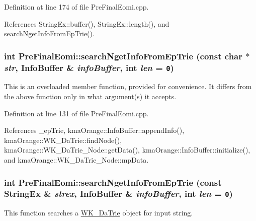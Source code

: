 Definition at line 174 of file PreFinalEomi.cpp.

References StringEx::buffer(), StringEx::length(), and searchNgetInfoFromEpTrie().\hypertarget{classkmaOrange_1_1PreFinalEomi_1440ff5046195cb344bb104b2a52f48a}{
\subsubsection[{searchNgetInfoFromEpTrie}]{\setlength{\rightskip}{0pt plus 5cm}int PreFinalEomi::searchNgetInfoFromEpTrie (const char $\ast$ {\em str}, \/  {\bf InfoBuffer} \& {\em infoBuffer}, \/  int {\em len} = {\tt 0})}}
\label{classkmaOrange_1_1PreFinalEomi_1440ff5046195cb344bb104b2a52f48a}


This is an overloaded member function, provided for convenience. It differs from the above function only in what argument(s) it accepts. 

Definition at line 131 of file PreFinalEomi.cpp.

References \_\-epTrie, kmaOrange::InfoBuffer::appendInfo(), kmaOrange::WK\_\-DaTrie::findNode(), kmaOrange::WK\_\-DaTrie\_\-Node::getData(), kmaOrange::InfoBuffer::initialize(), and kmaOrange::WK\_\-DaTrie\_\-Node::mpData.\hypertarget{classkmaOrange_1_1PreFinalEomi_cb448ebca8313831c9d6a91664165007}{
\subsubsection[{searchNgetInfoFromEpTrie}]{\setlength{\rightskip}{0pt plus 5cm}int PreFinalEomi::searchNgetInfoFromEpTrie (const {\bf StringEx} \& {\em strex}, \/  {\bf InfoBuffer} \& {\em infoBuffer}, \/  int {\em len} = {\tt 0})}}
\label{classkmaOrange_1_1PreFinalEomi_cb448ebca8313831c9d6a91664165007}


This function searches a \hyperlink{classkmaOrange_1_1WK__DaTrie}{WK\_\-DaTrie} object for input string. 

